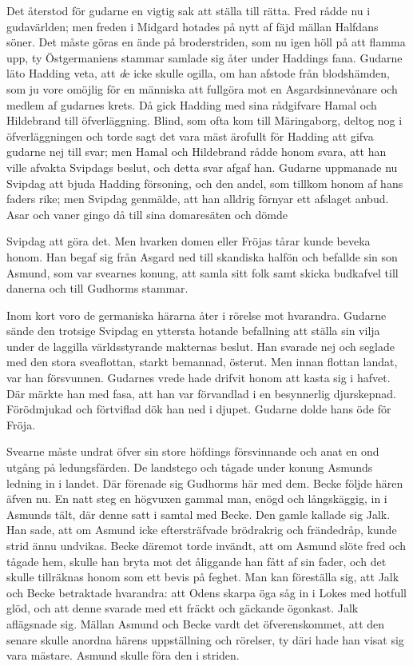Det återstod för gudarne en vigtig sak att ställa till rätta. Fred rådde
nu i gudavärlden; men freden i Midgard hotades på nytt af fäjd mällan
Halfdans söner. Det måste göras en ände på broderstriden, som nu igen
höll på att flamma upp, ty Östgermaniens stammar samlade sig åter under
Haddings fana. Gudarne läto Hadding veta, att {\emph de} icke skulle
ogilla, om han afstode från blodshämden, som ju vore omöjlig för en
människa att fullgöra mot en Asgardsinnevånare och medlem af gudarnes
krets. Då gick Hadding med sina rådgifvare Hamal och Hildebrand till
öfverläggning. Blind, som ofta kom till Märingaborg, deltog nog i
öfverläggningen och torde sagt det vara mäst ärofullt för Hadding att
gifva gudarne nej till svar; men Hamal och Hildebrand rådde honom svara,
att han ville afvakta Svipdags beslut, och detta svar afgaf han. Gudarne
uppmanade nu Svipdag att bjuda Hadding försoning, och den andel, som
tillkom honom af hans faders rike; men Svipdag genmälde, att han alldrig
förnyar ett afslaget anbud. Asar och vaner gingo då till sina
domaresäten och dömde

Svipdag att göra det. Men hvarken domen eller Fröjas tårar kunde beveka
honom. Han begaf sig från Asgard ned till skandiska halfön och befallde
sin son Asmund, som var svearnes konung, att samla sitt folk samt skicka
budkafvel till danerna och till Gudhorms stammar.

Inom kort voro de germaniska härarna åter i rörelse mot hvarandra.
Gudarne sände den trotsige Svipdag en yttersta hotande befallning att
ställa sin vilja under de laggilla världsstyrande makternas beslut. Han
svarade nej och seglade med den stora sveaflottan, starkt bemannad,
österut. Men innan flottan landat, var han försvunnen. Gudarnes vrede
hade drifvit honom att kasta sig i hafvet. Där märkte han med fasa, att
han var förvandlad i en besynnerlig djurskepnad. Förödmjukad och
förtviflad dök han ned i djupet. Gudarne dolde hans öde för Fröja.

Svearne måste undrat öfver sin store höfdings försvinnande och anat en
ond utgång på ledungsfärden. De landstego och tågade under konung
Asmunds ledning in i landet. Där förenade sig Gudhorms här med dem.
Becke följde hären äfven nu. En natt steg en högvuxen gammal man, enögd
och långskäggig, in i Asmunds tält, där denne satt i samtal med Becke.
Den gamle kallade sig Jalk. Han sade, att om Asmund icke eftersträfvade
brödrakrig och frändedråp, kunde strid ännu undvikas. Becke däremot
torde invändt, att om Asmund slöte fred och tågade hem, skulle han bryta
mot det åliggande han fått af sin fader, och det skulle tillräknas honom
som ett bevis på feghet. Man kan föreställa sig, att Jalk och Becke
betraktade hvarandra: att Odens skarpa öga såg in i Lokes med hotfull
glöd, och att denne svarade med ett fräckt och gäckande ögonkast. Jalk
aflägsnade sig. Mällan Asmund och Becke vardt det öfverenskommet, att
den senare skulle anordna härens uppställning och rörelser, ty däri hade
han visat sig vara mästare. Asmund skulle föra den i striden.

